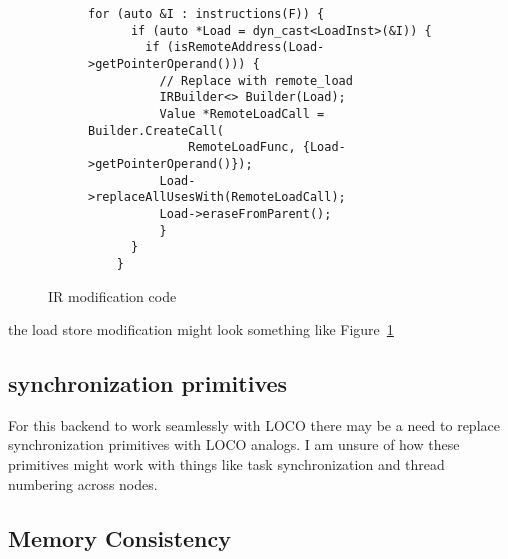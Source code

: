 \documentclass[sigplan,nonacm]{acmart}
\begin{document}
\begin{figure}
    \centering
    \begin{subfigure}{0.45\textwidth}
    \begin{lstlisting}[basicstyle={\ttfamily\scriptsize}]
    for (auto &I : instructions(F)) {
      if (auto *Load = dyn_cast<LoadInst>(&I)) {
        if (isRemoteAddress(Load->getPointerOperand())) {
          // Replace with remote_load
          IRBuilder<> Builder(Load);
          Value *RemoteLoadCall = Builder.CreateCall(
              RemoteLoadFunc, {Load->getPointerOperand()});
          Load->replaceAllUsesWith(RemoteLoadCall);
          Load->eraseFromParent();
          }
      }
    }
    \end{lstlisting}
    \end{subfigure}
    \caption{IR modification code}
    \label{fig:ir-modification}
    \end{figure}

the load store modification might look something like Figure~\ref{fig:ir-modification}



\subsection{synchronization primitives}
For this backend to work seamlessly with LOCO there may be a need to replace 
synchronization primitives with LOCO analogs. I am unsure of how these primitives might 
work with things like task synchronization and thread numbering across nodes.


\subsection{Memory Consistency}

\end{document}
